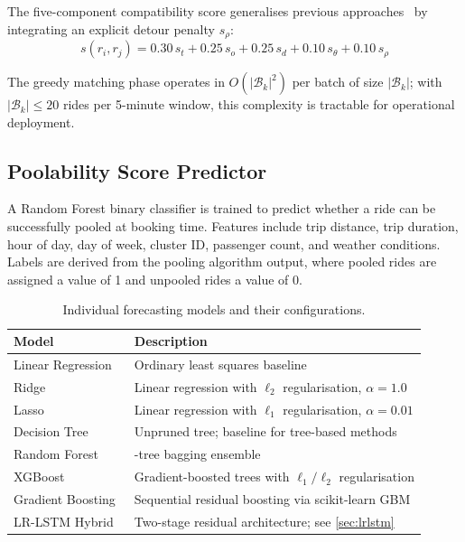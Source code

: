 \documentclass[a4paper,fleqn]{cas-dc}
\begin{document}
The five-component compatibility score generalises previous approaches~\cite{furuhata2013ridesharing} by integrating an explicit detour penalty $s_\rho$:
\begin{equation}
  s(r_i, r_j) = 0.30\,s_t + 0.25\,s_o + 0.25\,s_d + 0.10\,s_\theta + 0.10\,s_\rho
  \label{eq:compat}
\end{equation}

The greedy matching phase operates in $O(|\mathcal{B}_k|^2)$ per batch of size $|\mathcal{B}_k|$; with $|\mathcal{B}_k|\leq 20$ rides per 5-minute window, this complexity is tractable for operational deployment.

\subsection{Poolability Score Predictor}
\label{sec:poolability}

A Random Forest binary classifier is trained to predict whether a ride can be successfully pooled at booking time.  Features include trip distance, trip duration, hour of day, day of week, cluster ID, passenger count, and weather conditions.  Labels are derived from the pooling algorithm output, where pooled rides are assigned a value of 1 and unpooled rides a value of 0.

\begin{table}[t]
\centering
\caption{Individual forecasting models and their configurations.\label{tab:individual_models}}
\begin{tabularx}{\columnwidth}{>{\raggedright\arraybackslash}p{2.2cm} >{\raggedright\arraybackslash}X}
\toprule
\textbf{Model} & \textbf{Description} \\
\toprule
Linear Regression & Ordinary least squares baseline \\
Ridge~\cite{hoerl1970ridge} & Linear regression with $\ell_2$ regularisation, $\alpha=1.0$ \\
Lasso~\cite{tibshirani1996lasso} & Linear regression with $\ell_1$ regularisation, $\alpha=0.01$ \\
Decision Tree & Unpruned tree; baseline for tree-based methods \\
Random Forest~\cite{breiman2001rf} & 200-tree bagging ensemble \\
XGBoost~\cite{chen2016xgboost} & Gradient-boosted trees with $\ell_1/\ell_2$ regularisation \\
Gradient Boosting~\cite{friedman2001gbm} & Sequential residual boosting via scikit-learn GBM \\
LR-LSTM Hybrid~\cite{hochreiter1997long} & Two-stage residual architecture; see \autoref{sec:lrlstm} \\
\bottomrule
\end{tabularx}
\end{table}
\end{document}
